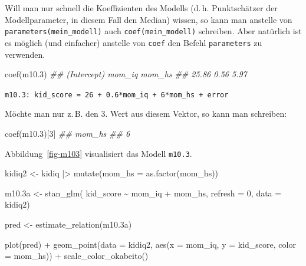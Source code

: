 \documentclass[
  ngerman,
  letterpaper,
  twoside,
  open=any]{scrbook}
\newenvironment{Shaded}{\begin{snugshade}}{\end{snugshade}}
\newcommand{\AttributeTok}[1]{\textcolor[rgb]{0.40,0.45,0.13}{#1}}
\newcommand{\DecValTok}[1]{\textcolor[rgb]{0.68,0.00,0.00}{#1}}
\newcommand{\DocumentationTok}[1]{\textcolor[rgb]{0.37,0.37,0.37}{\textit{#1}}}
\newcommand{\FloatTok}[1]{\textcolor[rgb]{0.68,0.00,0.00}{#1}}
\newcommand{\FunctionTok}[1]{\textcolor[rgb]{0.28,0.35,0.67}{#1}}
\newcommand{\NormalTok}[1]{\textcolor[rgb]{0.00,0.23,0.31}{#1}}
\newcommand{\OtherTok}[1]{\textcolor[rgb]{0.00,0.23,0.31}{#1}}
\newcommand{\SpecialCharTok}[1]{\textcolor[rgb]{0.37,0.37,0.37}{#1}}
\theoremstyle{definition}
\theoremstyle{plain}
\theoremstyle{definition}
\theoremstyle{definition}
\theoremstyle{definition}
\theoremstyle{definition}
\theoremstyle{remark}
\begin{document}
Will man nur schnell die Koeffizienten des Modells (d.\,h. Punktschätzer
der Modellparameter, in diesem Fall den Median) wissen, so kann man
anstelle von \texttt{parameters(mein\_modell)} auch
\texttt{coef(mein\_modell)} schreiben. Aber natürlich ist es möglich
(und einfacher) anstelle von \texttt{coef} den Befehl
\texttt{parameters} zu verwenden.

\begin{Shaded}
\begin{Highlighting}[]
\FunctionTok{coef}\NormalTok{(m10}\FloatTok{.3}\NormalTok{)}
\DocumentationTok{\#\# (Intercept)      mom\_iq      mom\_hs }
\DocumentationTok{\#\#       25.86        0.56        5.97}
\end{Highlighting}
\end{Shaded}

\texttt{m10.3:\ kid\_score\ =\ 26\ +\ 0.6*mom\_iq\ +\ 6*mom\_hs\ +\ error}

Möchte man nur z.\,B. den 3. Wert aus diesem Vektor, so kann man
schreiben:

\begin{Shaded}
\begin{Highlighting}[]
\FunctionTok{coef}\NormalTok{(m10}\FloatTok{.3}\NormalTok{)[}\DecValTok{3}\NormalTok{]}
\DocumentationTok{\#\# mom\_hs }
\DocumentationTok{\#\#      6}
\end{Highlighting}
\end{Shaded}

Abbildung~\ref{fig-m103} visualisiert das Modell \texttt{m10.3}.

\begin{Shaded}
\begin{Highlighting}[]
\NormalTok{kidiq2 }\OtherTok{\textless{}{-}}
\NormalTok{  kidiq }\SpecialCharTok{|\textgreater{}} 
  \FunctionTok{mutate}\NormalTok{(}\AttributeTok{mom\_hs =} \FunctionTok{as.factor}\NormalTok{(mom\_hs))}

\NormalTok{m10}\FloatTok{.3}\NormalTok{a }\OtherTok{\textless{}{-}} 
  \FunctionTok{stan\_glm}\NormalTok{(}
\NormalTok{    kid\_score }\SpecialCharTok{\textasciitilde{}}\NormalTok{ mom\_iq }\SpecialCharTok{+}\NormalTok{ mom\_hs, }
    \AttributeTok{refresh =} \DecValTok{0}\NormalTok{,}
    \AttributeTok{data =}\NormalTok{ kidiq2)}

\NormalTok{pred }\OtherTok{\textless{}{-}} \FunctionTok{estimate\_relation}\NormalTok{(m10}\FloatTok{.3}\NormalTok{a)}

\FunctionTok{plot}\NormalTok{(pred) }\SpecialCharTok{+}
  \FunctionTok{geom\_point}\NormalTok{(}\AttributeTok{data =}\NormalTok{ kidiq2, }\FunctionTok{aes}\NormalTok{(}\AttributeTok{x =}\NormalTok{ mom\_iq, }\AttributeTok{y =}\NormalTok{ kid\_score, }\AttributeTok{color =}\NormalTok{ mom\_hs)) }\SpecialCharTok{+}
  \FunctionTok{scale\_color\_okabeito}\NormalTok{()}
\end{Highlighting}
\end{Shaded}
\end{document}
